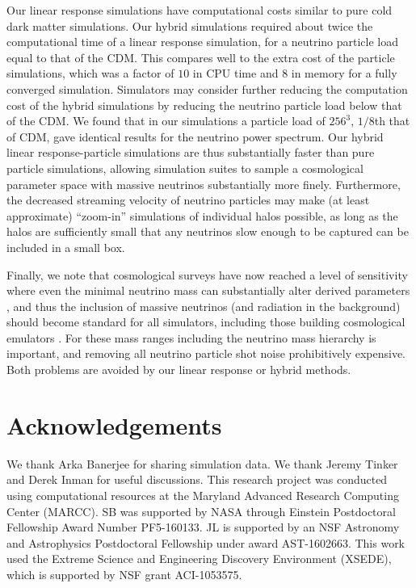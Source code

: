 \documentclass[useAMS, usenatbib]{mnras}
\begin{document}
Our linear response simulations have computational costs similar to pure cold dark matter simulations. Our hybrid simulations required about twice the computational time of a linear response simulation, for a neutrino particle load equal to that of the CDM. This compares well to the extra cost of the particle simulations, which was a factor of $10$ in CPU time and $8$ in memory for a fully converged simulation. Simulators may consider further reducing the computation cost of the hybrid simulations by reducing the neutrino particle load below that of the CDM. We found that in our simulations a particle load of $256^3$, $1/8$th that of CDM, gave identical results for the neutrino power spectrum. Our hybrid linear response-particle simulations are thus substantially faster than pure particle simulations, allowing simulation suites to sample a cosmological parameter space with massive neutrinos substantially more finely. Furthermore, the decreased streaming velocity of neutrino particles may make (at least approximate) ``zoom-in'' simulations of individual halos possible, as long as the halos are sufficiently small that any neutrinos slow enough to be captured can be included in a small box.

Finally, we note that cosmological surveys have now reached a level of sensitivity where even the minimal neutrino mass can substantially alter derived parameters \citep{Calabrese_2017}, and thus the inclusion of massive neutrinos (and radiation in the background) should become standard for all simulators, including those building cosmological emulators \citep{Lawrence_2017}. For these mass ranges including the neutrino mass hierarchy is important, and removing all neutrino particle shot noise prohibitively expensive. Both problems are avoided by our linear response or hybrid methods.


\section*{Acknowledgements}

We thank Arka Banerjee for sharing simulation data. We thank Jeremy Tinker and Derek Inman for useful discussions.
This research project was conducted using computational resources
at the Maryland Advanced Research Computing Center (MARCC). SB was supported by NASA through
Einstein Postdoctoral Fellowship Award Number PF5-160133. JL is supported by an NSF Astronomy and Astrophysics Postdoctoral Fellowship under award AST-1602663. This work used the Extreme Science and Engineering Discovery Environment (XSEDE), which is supported by NSF grant ACI-1053575.
\appendix
\end{document}
